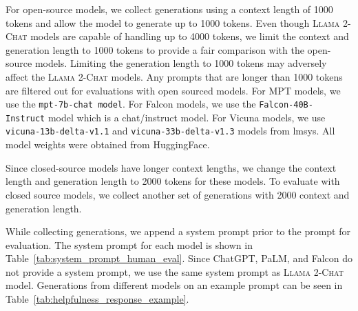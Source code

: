 \documentclass{article}
\newcommand{\modelname}{\textsc{Llama 2-Chat}\xspace}
\begin{document}
For open-source models, we collect generations using a context length of 1000 tokens and allow the model to generate up to 1000 tokens. Even though \modelname models are capable of handling up to 4000 tokens, we limit the context and generation length to 1000 tokens to provide a fair comparison with the open-source models. Limiting the generation length to 1000 tokens may adversely affect the \modelname models. Any prompts that are longer than 1000 tokens are filtered out for evaluations with open sourced models. For MPT models, we use the \texttt{mpt-7b-chat model}. For Falcon models, we use the \texttt{Falcon-40B-Instruct} model which is a chat/instruct model. For Vicuna models, we use \texttt{vicuna-13b-delta-v1.1} and \texttt{vicuna-33b-delta-v1.3} models from lmsys. All model weights were obtained from HuggingFace.

Since closed-source models have longer context lengths, we change the context length and generation length to 2000 tokens for these models. To evaluate with closed source models, we collect another set of generations with 2000 context and generation length.

While collecting generations, we append a system prompt prior to the prompt for evaluation. The system prompt for each model is shown in Table~\ref{tab:system_prompt_human_eval}. Since ChatGPT, PaLM, and Falcon do not provide a system prompt, we use the same system prompt as \modelname model. Generations from different models on an example prompt can be seen in Table~\ref{tab:helpfulness_response_example}.
\end{document}
